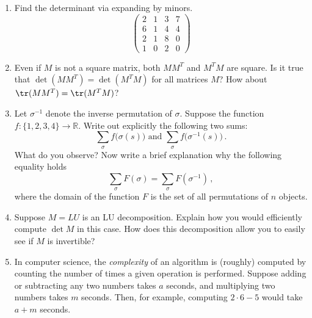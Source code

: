 


\begin{enumerate}

\item Find the determinant via expanding by minors.
$$
\begin{pmatrix}
2 & 1&3&7 \\
6& 1&4&4 \\
2 & 1&8&0 \\
1 & 0&2&0 
\end{pmatrix}
$$


\item Even if $M$ is not a square matrix, both $MM^{T}$ and $M^{T}M$ are square. Is it true that $\det (MM^T) =\det (M^T M) $ for all matrices $M$? How about $\tr(MM^T)= \tr (M^TM)$? 


%
%
%

\item \label{invsum} Let $\sigma^{-1}$ denote the inverse permutation of $\sigma$. Suppose the function $f:\{1,2,3,4\}\to {\mathbb R}$. Write out explicitly the following two sums:
$$
\sum_\sigma f\big(\sigma(s)\big)\mbox{ and } \sum_\sigma f\big(\sigma^{-1}(s)\big)\, .
$$
What do you observe? Now write a brief explanation why the following equality holds
$$
\sum_\sigma F(\sigma) =\sum_\sigma F(\sigma^{-1})\, ,
$$
where the domain of the function $F$ is the set of all permutations of $n$ objects.


\item Suppose $M=LU$ is an LU decomposition.  Explain how you would efficiently compute $\det M$ in this case. How does this decomposition allow you to easily see if $M$ is invertible? 



\item \label{problem_complexity} In computer science, the \emph{complexity} of an algorithm is (roughly) computed by counting the number of times a given operation is performed.  Suppose adding or subtracting any two numbers takes $a$ seconds, and multiplying two numbers takes $m$ seconds.  Then, for example, computing $2\cdot6-5$ would take $a+m$ seconds.




\end{enumerate}

